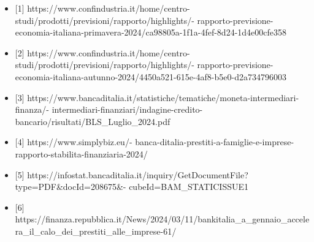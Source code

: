 \documentclass[
  letterpaper,
  DIV=11,
  numbers=noendperiod]{scrartcl}
\providecommand{\tightlist}{%
  \setlength{\itemsep}{0pt}\setlength{\parskip}{0pt}}\usepackage{longtable,booktabs,array}
\begin{document}
\begin{itemize}
\tightlist
\item
  {[}1{]}
  https://www.confindustria.it/home/centro-studi/prodotti/previsioni/rapporto/highlights/-
  rapporto-previsione-economia-italiana-primavera-2024/ca98805a-1f1a-4fef-8d24-1d4e00cfe358
\item
  {[}2{]}
  https://www.confindustria.it/home/centro-studi/prodotti/previsioni/rapporto/highlights/-
  rapporto-previsione-economia-italiana-autunno-2024/4450a521-615e-4af8-b5e0-d2a734796003
\item
  {[}3{]}
  https://www.bancaditalia.it/statistiche/tematiche/moneta-intermediari-finanza/-
  intermediari-finanziari/indagine-credito-bancario/risultati/BLS\_Luglio\_2024.pdf
\item
  {[}4{]} https://www.simplybiz.eu/-
  banca-ditalia-prestiti-a-famiglie-e-imprese-rapporto-stabilita-finanziaria-2024/
\item
  {[}5{]}
  https://infostat.bancaditalia.it/inquiry/GetDocumentFile?type=PDF\&docId=208675\&-
  cubeId=BAM\_STATICISSUE1
\item
  {[}6{]}
  https://finanza.repubblica.it/News/2024/03/11/bankitalia\_a\_gennaio\_accelera\_il\_calo\_dei\_prestiti\_alle\_imprese-61/
\end{itemize}
\end{document}
